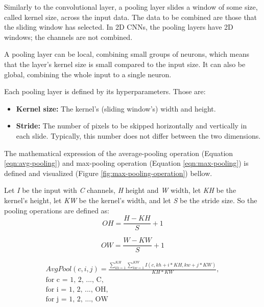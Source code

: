 Similarly to the convolutional layer, a pooling layer slides a window of some size, called kernel size, across the input data. The data to be combined are those that the sliding window has selected. In 2D CNNs, the pooling layers have 2D windows; the channels are not combined.

A pooling layer can be local, combining small groups of neurons, which means that the layer's kernel size is small compared to the input size. It can also be global, combining the whole input to a single neuron.

Each pooling layer is defined by its hyperparameters. Those are:
\begin{itemize}
	\item \textbf{Kernel size:} The kernel's (sliding window's) width and height.
	\item \textbf{Stride:} The number of pixels to be skipped horizontally and vertically in each slide. Typically, this number does not differ between the two dimensions.
\end{itemize}

The mathematical expression of the average-pooling operation (Equation \ref{eqn:avg-pooling}) and max-pooling operation (Equation \ref{eqn:max-pooling}) is defined and visualized (Figure \ref{fig:max-pooling-operation}) bellow.

Let \emph{I} be the input with \emph{C} channels, \emph{H} height and \emph{W} width, let \emph{KH} be the kernel's height, let \emph{KW} be the kernel's width, and let \emph{S} be the stride size. So the pooling operations are defined as:
\begin{equation}
	OH = \frac{H - KH}{S} + 1
\end{equation}

\begin{equation}
	OW = \frac{W - KW}{S} + 1
\end{equation}

\begin{equation}
	\label{eqn:avg-pooling}
	\begin{split}
		AvgPool(c, i, j) =
		\frac{
			\sum_{kh = 1}^{KH} \sum_{kw = 1}^{KW}
			I(c, kh + i * KH, kw + j * KW)
		}{
			KH * KW
		},\\
		\mbox{for c = 1, 2, ..., C},\\
		\mbox{for i = 1, 2, ..., OH},\\
		\mbox{for j = 1, 2, ..., OW}\\
	\end{split}
\end{equation}

